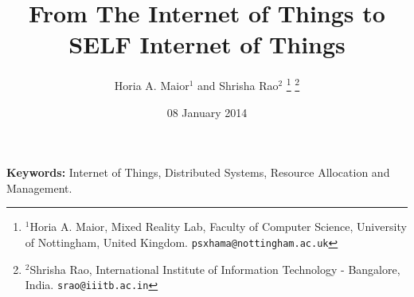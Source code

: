 \documentclass[letterpaper, 10 pt, conference]{ieeeconf}
\title{From The Internet of Things to SELF Internet of Things}
\author{Horia A. Maior$^{1}$ and Shrisha Rao$^{2}$%
\thanks{$^{1}$Horia A. Maior, Mixed Reality Lab, Faculty of Computer Science, University of Nottingham, United Kingdom.
        {\tt\small psxhama@nottingham.ac.uk}}%
\thanks{$^{2}$Shrisha Rao, International Institute of Information Technology - Bangalore, India.
        {\tt\small srao@iiitb.ac.in}}%
}
\begin{document}
\maketitle
\thispagestyle{empty}
\pagestyle{empty}




\date{08 January 2014}




{\bf Keywords:} Internet of Things, Distributed Systems, Resource Allocation and Management.







%



\end{document}
